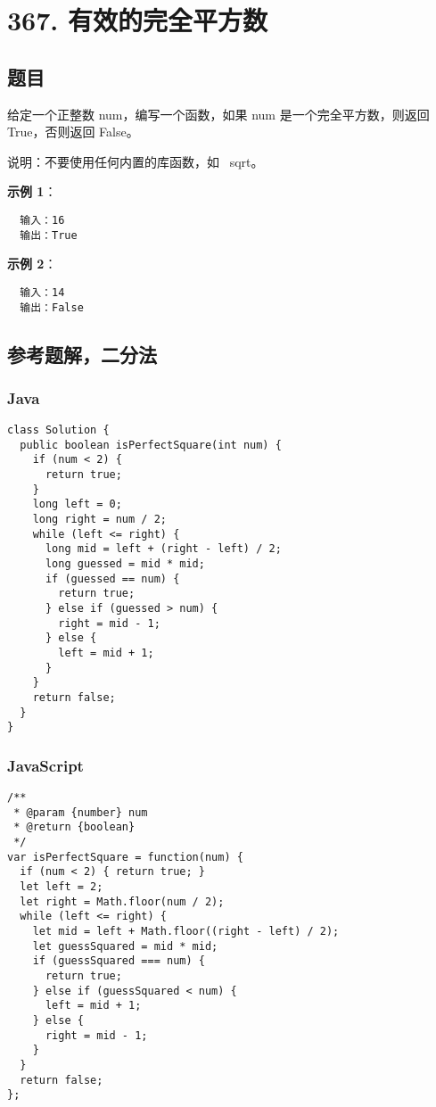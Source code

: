 \newpage
\section{367. 有效的完全平方数}
\label{leetcode:367}

\subsection{题目}

给定一个正整数 num，编写一个函数，如果 num 是一个完全平方数，则返回 True，否则返回 False。

说明：不要使用任何内置的库函数，如  sqrt。

\textbf{示例 1}：

\begin{verbatim}
  输入：16
  输出：True
\end{verbatim}

\textbf{示例 2}：

\begin{verbatim}
  输入：14
  输出：False
\end{verbatim}

\subsection{参考题解，二分法}

\subsubsection{Java}

\begin{verbatim}
class Solution {
  public boolean isPerfectSquare(int num) {
    if (num < 2) {
      return true;
    }
    long left = 0;
    long right = num / 2;
    while (left <= right) {
      long mid = left + (right - left) / 2;
      long guessed = mid * mid;
      if (guessed == num) {
        return true;
      } else if (guessed > num) {
        right = mid - 1;
      } else {
        left = mid + 1;
      }
    }
    return false;
  }
}
\end{verbatim}

\subsubsection{JavaScript}

\begin{verbatim}
/**
 * @param {number} num
 * @return {boolean}
 */
var isPerfectSquare = function(num) {
  if (num < 2) { return true; }
  let left = 2;
  let right = Math.floor(num / 2);
  while (left <= right) {
    let mid = left + Math.floor((right - left) / 2);
    let guessSquared = mid * mid;
    if (guessSquared === num) {
      return true;
    } else if (guessSquared < num) {
      left = mid + 1;
    } else {
      right = mid - 1;
    }
  }
  return false;
};
\end{verbatim}
